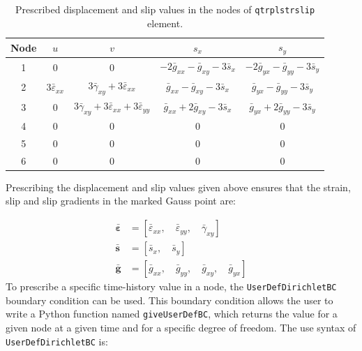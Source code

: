 \documentclass[11pt]{article}
\begin{document}
\begin{table}[H]
    \centering
    \caption{Prescribed displacement and slip values in the nodes of \texttt{qtrplstrslip} element.}
    \begin{tabular}{|c|c|c|c|c|}
    \hline
    \textbf{Node} & $u$ & $v$ & $s_x$ & $s_y$ \\ \hline
    1    & $0$   & $0$    & $-2\bar{g}_{xx} - \bar{g}_{xy} - 3\bar{s}_x$      &  $-2\bar{g}_{yx} - \bar{g}_{yy} - 3\bar{s}_y$      \\ \hline
    2    & $3\bar{\varepsilon}_{xx}$    & $3\bar{\gamma}_{xy} + 3\bar{\varepsilon}_{xx}$    &  $\bar{g}_{xx} - \bar{g}_{xy} - 3\bar{s}_x$     & $\bar{g}_{yx} - \bar{g}_{yy} - 3\bar{s}_y$      \\ \hline
    3    & $0$    & $3\bar{\gamma}_{xy} + 3\bar{\varepsilon}_{xx} +3\bar{\varepsilon}_{yy}$    & $\bar{g}_{xx} + 2\bar{g}_{xy} - 3\bar{s}_x$      & $\bar{g}_{yx} + 2\bar{g}_{yy} - 3\bar{s}_y$      \\ \hline
    4    & $0$    & $0$    &  $0$     &  $0$     \\ \hline
    5    & $0$    & $0$    &  $0$     &  $0$     \\ \hline
    6    & $0$    & $0$    &  $0$     &  $0$     \\ \hline
    \end{tabular}
    \label{tab:fakefe2dispslip}
\end{table}

\noindent Prescribing the displacement and slip values given above ensures that the strain, slip and slip gradients in the marked Gauss point are:

\begin{align*}
    \bm{\bar{\varepsilon}} &= \left[ \bar{\varepsilon}_{xx}, \quad \bar{\varepsilon}_{yy}, \quad \bar{\gamma}_{xy} \right] \\
    \bm{\bar{s}} &= \left[ \bar{s}_x, \quad \bar{s}_y \right]\\
    \bm{\bar{g}} &= \left[ \bar{g}_{xx}, \quad \bar{g}_{yy}, \quad \bar{g}_{xy}, \quad \bar{g}_{yx} \right]
\end{align*}
To prescribe a specific time-history value in a node, the \texttt{UserDefDirichletBC} boundary condition can be used. 
This boundary condition allows the user to write a Python function named \texttt{giveUserDefBC}, which returns the value for a given node at a given time and for a specific degree of freedom. 
The use syntax of \texttt{UserDefDirichletBC} is:
\newline
\end{document}
